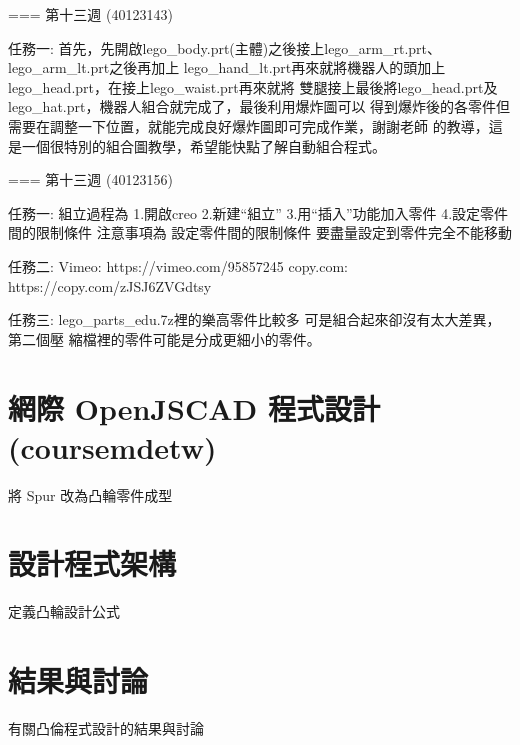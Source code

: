 \documentclass[]{article}
\begin{document}
=== 第十三週 (40123143)

任務一:
首先，先開啟lego\_body.prt(主體)之後接上lego\_arm\_rt.prt、lego\_arm\_lt.prt之後再加上
lego\_hand\_lt.prt再來就將機器人的頭加上lego\_head.prt，在接上lego\_waist.prt再來就將
雙腿接上最後將lego\_head.prt及lego\_hat.prt，機器人組合就完成了，最後利用爆炸圖可以
得到爆炸後的各零件但需要在調整一下位置，就能完成良好爆炸圖即可完成作業，謝謝老師
的教導，這是一個很特別的組合圖教學，希望能快點了解自動組合程式。

=== 第十三週 (40123156)

任務一: 組立過程為 1.開啟creo 2.新建``組立'' 3.用``插入''功能加入零件
4.設定零件間的限制條件 注意事項為 設定零件間的限制條件
要盡量設定到零件完全不能移動

任務二: Vimeo: https://vimeo.com/95857245 copy.com:
https://copy.com/zJSJ6ZVGdtsy

任務三: lego\_parts\_edu.7z裡的樂高零件比較多
可是組合起來卻沒有太大差異，第二個壓
縮檔裡的零件可能是分成更細小的零件。

\section{網際 OpenJSCAD
程式設計(coursemdetw)}\label{ux7db2ux969b-openjscad-ux7a0bux5f0fux8a2dux8a08coursemdetw}

將 Spur 改為凸輪零件成型

\section{設計程式架構}\label{ux8a2dux8a08ux7a0bux5f0fux67b6ux69cb}

定義凸輪設計公式

\section{結果與討論}\label{ux7d50ux679cux8207ux8a0eux8ad6-5}

有關凸倫程式設計的結果與討論
\end{document}
